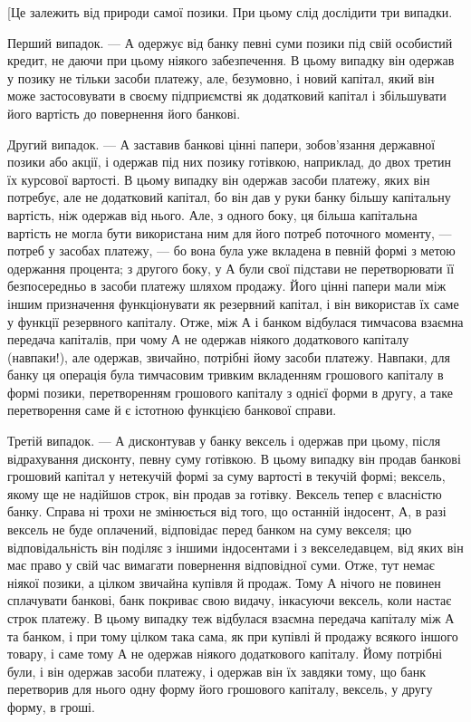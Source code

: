 [Це залежить від природи самої позики. При цьому слід
дослідити три випадки.

Перший випадок. — А одержує від банку певні суми позики під
свій особистий кредит, не даючи при цьому ніякого забезпечення.
В цьому випадку він одержав у позику не тільки засоби платежу,
але, безумовно, і новий капітал, який він може застосовувати
в своєму підприємстві як додатковий капітал і збільшувати
його вартість до повернення його банкові.

Другий випадок. — А заставив банкові цінні папери, зобов’язання
державної позики або акції, і одержав під них позику
готівкою, наприклад, до двох третин їх курсової вартості. В
цьому випадку він одержав засоби платежу, яких він потребує,
але не додатковий капітал, бо він дав у руки банку більшу
капітальну вартість, ніж одержав від нього. Але, з одного боку,
ця більша капітальна вартість не могла бути використана ним
для його потреб поточного моменту, — потреб у засобах платежу,
— бо вона була уже вкладена в певній формі з метою одержання
процента; з другого боку, у А були свої підстави не перетворювати
її безпосередньо в засоби платежу шляхом продажу.
Його цінні папери мали між іншим призначення функціонувати
як резервний капітал, і він використав їх саме у функції резервного
капіталу. Отже, між А і банком відбулася тимчасова взаємна
передача капіталів, при чому А не одержав ніякого додаткового
капіталу (навпаки!), але одержав, звичайно, потрібні йому засоби
платежу. Навпаки, для банку ця операція була тимчасовим тривким
вкладенням грошового капіталу в формі позики, перетворенням
грошового капіталу з однієї форми в другу, а таке
перетворення саме й є істотною функцією банкової справи.

Третій випадок. — А дисконтував у банку вексель і одержав
при цьому, після відрахування дисконту, певну суму готівкою.
В цьому випадку він продав банкові грошовий капітал у нетекучій
формі за суму вартості в текучій формі; вексель, якому
ще не надійшов строк, він продав за готівку. Вексель тепер
є власністю банку. Справа ні трохи не змінюється від того, що
останній індосент, А, в разі вексель не буде оплачений, відповідає
перед банком на суму векселя; цю відповідальність він
поділяє з іншими індосентами і з векселедавцем, від яких він має
право у свій час вимагати повернення відповідної суми. Отже,
тут немає ніякої позики, а цілком звичайна купівля й продаж.
Тому А нічого не повинен сплачувати банкові, банк покриває
свою видачу, інкасуючи вексель, коли настає строк платежу.
В цьому випадку теж відбулася взаємна передача капіталу між А
та банком, і при тому цілком така сама, як при купівлі й продажу
всякого іншого товару, і саме тому А не одержав ніякого
додаткового капіталу. Йому потрібні були, і він одержав засоби
платежу, і одержав він їх завдяки тому, що банк перетворив
для нього одну форму його грошового капіталу, вексель, у
другу форму, в гроші.

